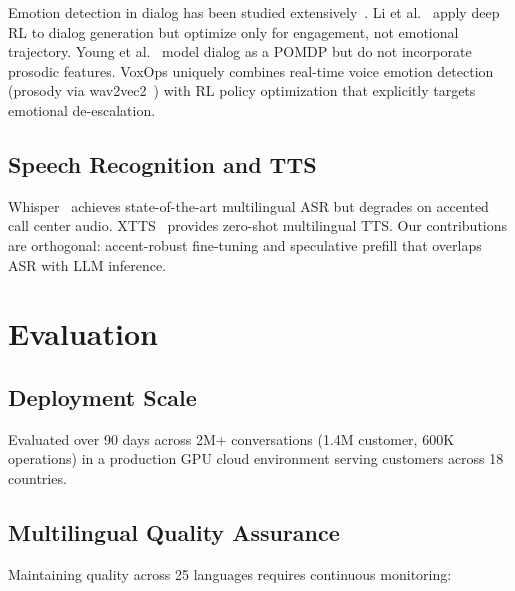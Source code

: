 \documentclass[conference,10pt]{IEEEtran}
\begin{document}
Emotion detection in dialog has been studied extensively~\cite{wagner2023emotion}. Li et al.~\cite{li2016deep} apply deep RL to dialog generation but optimize only for engagement, not emotional trajectory. Young et al.~\cite{young2013pomdp} model dialog as a POMDP but do not incorporate prosodic features. VoxOps uniquely combines real-time voice emotion detection (prosody via wav2vec2~\cite{baevski2020wav2vec}) with RL policy optimization that explicitly targets emotional de-escalation.

\subsection{Speech Recognition and TTS}

Whisper~\cite{radford2023whisper} achieves state-of-the-art multilingual ASR but degrades on accented call center audio. XTTS~\cite{casanova2024xtts} provides zero-shot multilingual TTS. Our contributions are orthogonal: accent-robust fine-tuning and speculative prefill that overlaps ASR with LLM inference.

\section{Evaluation}
\label{sec:eval}

\subsection{Deployment Scale}

Evaluated over 90 days across 2M+ conversations (1.4M customer, 600K operations) in a production GPU cloud environment serving customers across 18 countries.



\subsection{Multilingual Quality Assurance}

Maintaining quality across 25 languages requires continuous monitoring:
\end{document}
